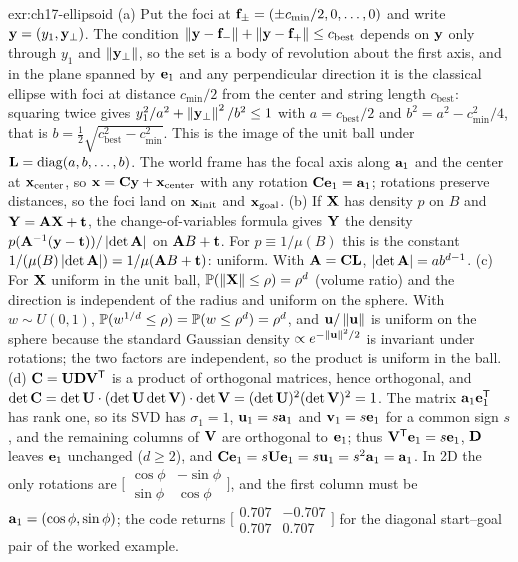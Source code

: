 \begin{solution}{exr:ch17-ellipsoid}
(a) Put the foci at $\mathbf{f}_\pm=(\pm c_{\min}/2,0,\dots,0)$ and write $\mathbf{y}=(y_1,\mathbf{y}_\perp)$. The condition $\left\lVert \mathbf{y}-\mathbf{f}_- \right\rVert+\left\lVert \mathbf{y}-\mathbf{f}_+ \right\rVert\le c_{\mathrm{best}}$ depends on $\mathbf{y}$ only through $y_1$ and $\left\lVert \mathbf{y}_\perp \right\rVert$, so the set is a body of revolution about the first axis, and in the plane spanned by $\mathbf{e}_1$ and any perpendicular direction it is the classical ellipse with foci at distance $c_{\min}/2$ from the center and string length $c_{\mathrm{best}}$: squaring twice gives $y_1^2/a^2+\left\lVert \mathbf{y}_\perp \right\rVert^2/b^2\le1$ with $a=c_{\mathrm{best}}/2$ and $b^2=a^2-c_{\min}^2/4$, that is $b=\tfrac12\sqrt{c_{\mathrm{best}}^2-c_{\min}^2}$. This is the image of the unit ball under $\mathbf{L}=\operatorname{diag}(a,b,\dots,b)$. The world frame has the focal axis along $\mathbf{a}_1$ and the center at $\mathbf{x}_{\mathrm{center}}$, so $\mathbf{x}=\mathbf{C}\mathbf{y}+\mathbf{x}_{\mathrm{center}}$ with any rotation $\mathbf{C}\mathbf{e}_1=\mathbf{a}_1$; rotations preserve distances, so the foci land on $\mathbf{x}_{\mathrm{init}}$ and $\mathbf{x}_{\mathrm{goal}}$.
(b) If $\mathbf{X}$ has density $p$ on $B$ and $\mathbf{Y}=\mathbf{A}\mathbf{X}+\mathbf{t}$, the change-of-variables formula gives $\mathbf{Y}$ the density $p(\mathbf{A}^{-1}(\mathbf{y}-\mathbf{t}))/\left\lvert \det\mathbf{A} \right\rvert$ on $\mathbf{A}B+\mathbf{t}$. For $p\equiv1/\mu(B)$ this is the constant $1/(\mu(B)\left\lvert \det\mathbf{A} \right\rvert)=1/\mu(\mathbf{A}B+\mathbf{t})$: uniform. With $\mathbf{A}=\mathbf{C}\mathbf{L}$, $\left\lvert \det\mathbf{A} \right\rvert=ab^{d-1}$.
(c) For $\mathbf{X}$ uniform in the unit ball, $\mathbb{P}(\left\lVert \mathbf{X} \right\rVert\le\rho)=\rho^d$ (volume ratio) and the direction is independent of the radius and uniform on the sphere. With $w\sim U(0,1)$, $\mathbb{P}(w^{1/d}\le\rho)=\mathbb{P}(w\le\rho^d)=\rho^d$, and $\mathbf{u}/\left\lVert \mathbf{u} \right\rVert$ is uniform on the sphere because the standard Gaussian density $\propto e^{-\left\lVert \mathbf{u} \right\rVert^2/2}$ is invariant under rotations; the two factors are independent, so the product is uniform in the ball.
(d) $\mathbf{C}=\mathbf{U}\mathbf{D}\mathbf{V}^{\mathsf{T}}$ is a product of orthogonal matrices, hence orthogonal, and $\det\mathbf{C}=\det\mathbf{U}\cdot(\det\mathbf{U}\det\mathbf{V})\cdot\det\mathbf{V}=(\det\mathbf{U})^2(\det\mathbf{V})^2=1$. The matrix $\mathbf{a}_1\mathbf{e}_1^{\mathsf{T}}$ has rank one, so its SVD has $\sigma_1=1$, $\mathbf{u}_1=s\mathbf{a}_1$ and $\mathbf{v}_1=s\mathbf{e}_1$ for a common sign $s$, and the remaining columns of $\mathbf{V}$ are orthogonal to $\mathbf{e}_1$; thus $\mathbf{V}^{\mathsf{T}}\mathbf{e}_1=s\mathbf{e}_1$, $\mathbf{D}$ leaves $\mathbf{e}_1$ unchanged ($d\ge2$), and $\mathbf{C}\mathbf{e}_1=s\mathbf{U}\mathbf{e}_1=s\mathbf{u}_1=s^2\mathbf{a}_1=\mathbf{a}_1$. In 2D the only rotations are $\bigl[\begin{smallmatrix}\cos\phi&-\sin\phi\\\sin\phi&\cos\phi\end{smallmatrix}\bigr]$, and the first column must be $\mathbf{a}_1=(\cos\phi,\sin\phi)$; the code returns $\bigl[\begin{smallmatrix}0.707&-0.707\\0.707&0.707\end{smallmatrix}\bigr]$ for the diagonal start--goal pair of the worked example.
\end{solution}

